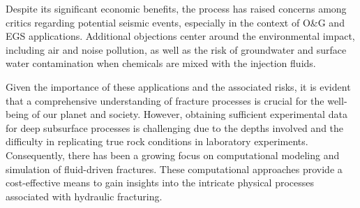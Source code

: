 Despite its significant economic benefits, the process has raised concerns among critics regarding potential seismic events, especially in the context of O\&G and EGS applications. Additional objections center around the environmental impact, including air and noise pollution, as well as the risk of groundwater and surface water contamination when chemicals are mixed with the injection fluids.

Given the importance of these applications and the associated risks, it is evident that a comprehensive understanding of fracture processes is crucial for the well-being of our planet and society. However, obtaining sufficient experimental data for deep subsurface processes is challenging due to the depths involved and the difficulty in replicating true rock conditions in laboratory experiments. Consequently, there has been a growing focus on computational modeling and simulation of fluid-driven fractures. These computational approaches provide a cost-effective means to gain insights into the intricate physical processes associated with hydraulic fracturing.

